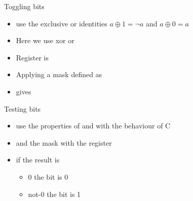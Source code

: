 \documentclass[svgnames,x11names]{beamer}
\begin{document}
\begin{frame}[fragile]{Toggling bits}
  \begin{itemize}
  \item use the \alert{exclusive or} identities $ a \oplus 1 = \neg a$ and $a \oplus 0 = a$
  \item Here we use \alert{xor}
      or
  \end{itemize}

  \begin{example}
    \begin{itemize}
    \item 
    Register is
    \item Applying a mask defined as
    \item gives 
    \end{itemize}
  \end{example}
\end{frame}


\begin{frame}[fragile]{Testing bits}
  \begin{itemize}
  \item use the properties of \alert{and} with the behaviour of C
  \item \alert{and} the \alert{mask} with the register
  \item if the result is
    \begin{itemize}
    \item 0 the bit is 0
    \item not-0 the bit is 1
    \end{itemize}

  \end{itemize}
\end{frame}
\end{document}
